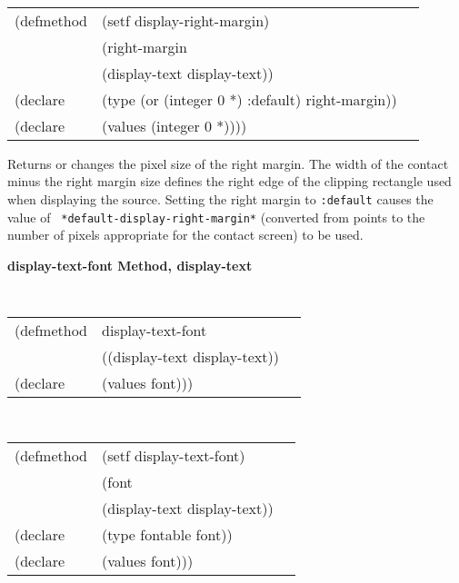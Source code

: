 \begin{flushright} \parbox[t]{6.125in}{
\tt
\begin{tabular}{lll}
\raggedright
(defmethod & (setf display-right-margin) & \\
         & (right-margin \\
         & (display-text  display-text)) \\
(declare &(type (or (integer 0 *) :default)  right-margin))\\
(declare & (values (integer 0 *))))
\end{tabular}
\rm}
\end{flushright}

\begin{flushright} \parbox[t]{6.125in}{
Returns or changes the pixel size of the
right margin.  The width of the contact minus the right margin size defines
the right edge of the clipping rectangle used when displaying the source.
Setting the right margin to {\tt :default} causes the value of {\tt
*default-display-right-margin*} (converted from points to the number of pixels
appropriate for the contact screen) to be used.
}
\end{flushright}




{\samepage  
{\large {\bf display-text-font \hfill Method, display-text}}
\begin{flushright} \parbox[t]{6.125in}{
\tt
\begin{tabular}{lll}
\raggedright
(defmethod & display-text-font & \\
& ((display-text  display-text)) \\
(declare & (values font)))
\end{tabular}
\rm

}\end{flushright}}

\begin{flushright} \parbox[t]{6.125in}{
\tt
\begin{tabular}{lll}
\raggedright
(defmethod & (setf display-text-font) & \\
         & (font \\
         & (display-text  display-text)) \\
(declare &(type fontable  font))\\
(declare & (values font)))
\end{tabular}
\rm}
\end{flushright}

